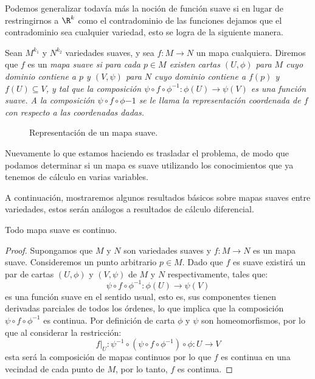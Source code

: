 Podemos generalizar todavía más la noción de función suave si en lugar de restringirnos a $\R^k$ como el contradominio de las funciones dejamos que el contradominio sea cualquier variedad, esto se logra de la siguiente manera.

\begin{definition}\label{Definición: Mapa Suave}
	Sean $M^{k_1}$ y $N^{k_2}$ variedades suaves, y sea $f: M \to N$ un mapa cualquiera. Diremos que $f$ es un \it{mapa suave} si para cada $p \in M$ existen cartas $(U,\phi)$ para $M$ cuyo dominio contiene a $p$ y $(V,\psi)$ para $N$ cuyo dominio contiene a $f(p)$ y $f(U) \subseteq V$, y tal que la composición $\psi \circ f \circ \phi^{-1}: \phi(U) \to \psi(V)$ es una función suave. A la composición $\psi \circ f \circ \phi{-1}$ se le llama la \it{representación coordenada de} $f$ con respecto a las coordenadas dadas.
\end{definition}

\begin{figure}[h]
	\centering
	\scalebox{.80}{}
	\caption{Representación de un mapa suave.}
\end{figure}

Nuevamente lo que estamos haciendo es trasladar el problema, de modo que podamos determinar si un mapa es suave utilizando los conocimientos que ya tenemos de cálculo en varias variables.

A continuación, mostraremos algunos resultados básicos sobre mapas suaves entre variedades, estos serán análogos a resultados de cálculo diferencial.

\begin{theorem}
	Todo mapa suave es continuo.
\end{theorem}

\begin{proof}
	Supongamos que $M$ y $N$ son variedades suaves y $f: M \to N$ es un mapa suave. Consideremos un punto arbitrario $p \in M$. Dado que $f$ es suave existirá un par de cartas $(U,\phi)$ y $(V,\psi)$ de $M$ y $N$ respectivamente, tales que:
	\[
		\psi \circ f \circ \phi^{-1}: \phi(U) \to \psi(V)
	\]
	es una función suave en el sentido usual, esto es, sus componentes tienen derivadas parciales de todos los órdenes, lo que implica que la composición $\psi \circ f \circ \phi^{-1}$ es continua. Por definición de carta $\phi$ y $\psi$ son homeomorfismos, por lo que al considerar la restricción:
	\[
		f |_{U} : \psi^{-1} \circ (\psi \circ f \circ \phi^{-1}) \circ \phi : U \to V
	\]
	esta será la composición de mapas continuos por lo que $f$ es continua en una vecindad de cada punto de $M$, por lo tanto, $f$ es continua.
\end{proof}


